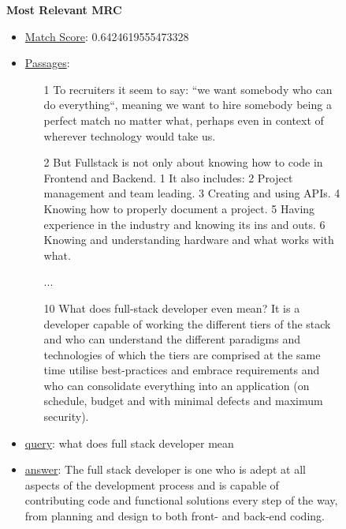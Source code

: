 \begin{figure*}[!htbp]
\begin{tcolorbox}
\textbf{Most Relevant MRC}
\begin{itemize}
[leftmargin=*,noitemsep,topsep=0pt]
\item \underline{Match Score}: 0.6424619555473328
\item \underline{Passages}: 
    \begin{itemize}
    [leftmargin=*,noitemsep,topsep=0pt]
    \item [1]To recruiters it seem to say: “we want somebody who can do everything“, meaning we want to hire somebody being a perfect match no matter what, perhaps even in context of wherever technology would take us.
    \item [2] But Fullstack is not only about knowing how to code in Frontend and Backend. 1  It also includes: 2  Project management and team leading. 3  Creating and using APIs. 4  Knowing how to properly document a project. 5  Having experience in the industry and knowing its ins and outs. 6  Knowing and understanding hardware and what works with what.
    \item [\quad] ...
    \item [10] What does full-stack developer even mean? It is a developer capable of working the different tiers of the stack and who can understand the different paradigms and technologies of which the tiers are comprised at the same time utilise best-practices and embrace requirements and who can consolidate everything into an application (on schedule, budget and with minimal defects and maximum security).
    \end{itemize}
\item \underline{query}: what does full stack developer mean
\item \underline{answer}: The full stack developer is one who is adept at all aspects of the development process and is capable of contributing code and functional solutions every step of the way, from planning and design to both front- and back-end coding.
\end{itemize}


\end{tcolorbox}
\end{figure*}
